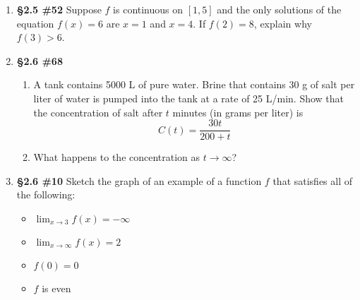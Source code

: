 \documentclass[%
]{article}
\begin{document}
\begin{enumerate}
\item {\bf \S2.5 \#52} Suppose $f$ is continuous on $[1,5]$ and the only solutions of the equation $f(x)=6$ are $x=1$ and $x=4$.  If $f(2)=8$, explain why $f(3)>6$. 

\item {\bf \S2.6 \#68}\begin{enumerate}
	\item A tank contains 5000 L of pure water.  Brine that contains 30 g of salt per liter of water is pumped into the tank at a rate of 25 L/min.  Show that the concentration of salt after $t$ minutes (in grams per liter) is 
	\[
	C(t)=\frac{30t}{200+t}
	\]
	\item What happens to the concentration as $t\to \infty$?
	\end{enumerate}

\item {\bf \S2.6 \#10} Sketch the graph of an example of a function $f$ that satisfies all of the following:
	\begin{itemize}
	\item $\displaystyle\lim_{x\to 3} f(x)=-\infty$
	\item $\displaystyle\lim_{x\to \infty}f(x)=2$
	\item $f(0)=0$
	\item $f$ is even
	\end{itemize}

\end{enumerate}
\end{document}
